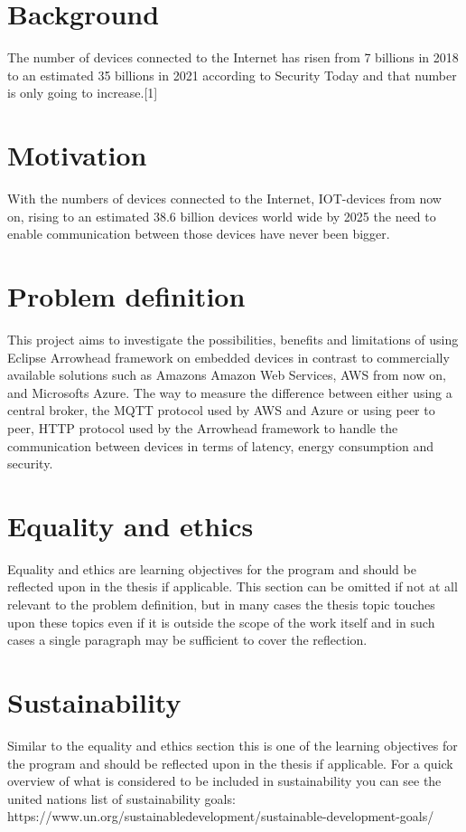 \section{Background}
The number of devices connected to the Internet has risen from 7 billions in 2018 to an estimated 35 billions in 2021 according to Security Today and that number is only going to increase.[1] %
\section{Motivation}
With the numbers of devices connected to the Internet, IOT-devices from now on, rising to an estimated 38.6 billion devices world wide by 2025 the need to enable communication between those devices have never been bigger.
\section{Problem definition}
This project aims to investigate the possibilities, benefits and limitations of using Eclipse Arrowhead framework on embedded devices in contrast to commercially available solutions such
as Amazons Amazon Web Services, AWS 
from now on, and Microsofts Azure.  
The way to measure the difference between either 
using a central broker, the MQTT protocol used by AWS and Azure or using peer to peer, 
HTTP protocol used by the Arrowhead framework to handle the communication between devices in terms of latency, 
energy consumption and
security.
\section{Equality and ethics}
Equality and ethics are learning objectives for the program and should be reflected upon in the thesis if applicable. This section can be omitted if not at all relevant to the problem definition, but in many cases the thesis topic touches upon these topics even if it is outside the scope of the work itself and in such cases a single paragraph may be sufficient to cover the reflection.
\section{Sustainability}
Similar to the equality and ethics section this is one of the learning objectives for the program and should be reflected upon in the thesis if applicable. For a quick overview of what is considered to be included in sustainability you can see the united nations list of sustainability goals: https://www.un.org/sustainabledevelopment/sustainable-development-goals/
